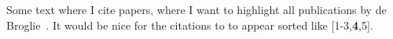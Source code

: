 \documentclass{article}
\begin{document}
Some text where I cite papers, where I want to highlight all publications by de Broglie~\cite{refA, refB, refC, refBOLD, refD}. 
It would be nice for the citations to to appear sorted like [1-3,{\textbf 4},5].



\end{document}

